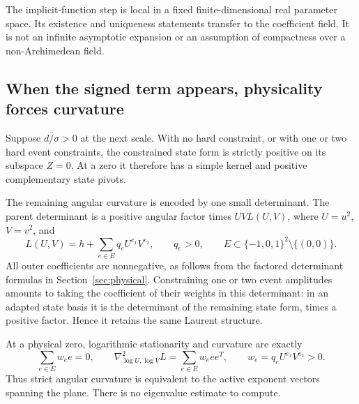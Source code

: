The implicit-function step is local in a fixed finite-dimensional real
parameter space.  Its existence and uniqueness statements transfer to the
coefficient field.  It is not an infinite asymptotic expansion or an
assumption of compactness over a non-Archimedean field.

\subsection{When the signed term appears, physicality forces curvature}
Suppose $\overline{d/\sigma}>0$ at the next scale.  With no hard constraint,
or with one or two hard event constraints, the constrained state form is
strictly positive on its subspace $Z=0$.  At a zero it therefore has a simple
kernel and positive complementary state pivots.

The remaining angular curvature is encoded by one small determinant.
The parent determinant is a positive angular factor times $UVL(U,V)$,
where $U=u^2$, $V=v^2$, and
\begin{equation}\label{eq:pp-laurent}
 L(U,V)=h+\sum_{e\in E}q_eU^{e_1}V^{e_2},
 \qquad q_e>0,\qquad
 E\subset\{-1,0,1\}^2\setminus\{(0,0)\}.
\end{equation}
All outer coefficients are nonnegative, as follows from the factored
determinant formulas in Section~\ref{sec:physical}.  Constraining one or two
event amplitudes amounts to taking the coefficient of their weights in
this determinant: in an adapted state basis it is the determinant of the
remaining state form, times a positive factor.  Hence it retains the same
Laurent structure.

At a physical zero, logarithmic stationarity and curvature are exactly
\begin{equation}\label{eq:pp-newton-hessian}
 \sum_{e\in E}w_e e=0,\qquad
 \nabla^2_{\log U,\log V}L=\sum_{e\in E}w_e ee^T,
 \qquad w_e=q_eU^{e_1}V^{e_2}>0.
\end{equation}
Thus strict angular curvature is equivalent to the active exponent vectors
spanning the plane.  There is no eigenvalue estimate to compute.

